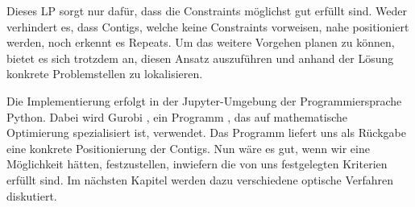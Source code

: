 Dieses LP sorgt nur dafür, dass die Constraints möglichst gut erfüllt sind. Weder verhindert es, dass Contigs, welche keine Constraints vorweisen, nahe positioniert werden, noch erkennt es Repeats. Um das weitere Vorgehen planen zu können, bietet es sich trotzdem an, diesen Ansatz auszuführen und anhand der Lösung konkrete Problemstellen zu lokalisieren. 


Die Implementierung erfolgt in der Jupyter-Umgebung der Programmiersprache Python. Dabei wird Gurobi \cite{Gurobi}, 
ein Programm
, das auf mathematische Optimierung spezialisiert ist, verwendet. Das Programm liefert uns als Rückgabe eine konkrete Positionierung der Contigs. Nun wäre es gut, wenn wir eine Möglichkeit hätten, festzustellen, inwiefern die von uns festgelegten Kriterien erfüllt sind. Im nächsten Kapitel werden dazu verschiedene optische Verfahren diskutiert.




